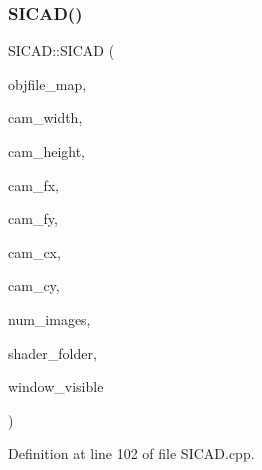 \subsubsection{\texorpdfstring{S\+I\+C\+A\+D()}{SICAD()}\hspace{0.1cm}{\footnotesize\ttfamily [8/9]}}
{\footnotesize\ttfamily S\+I\+C\+A\+D\+::\+S\+I\+C\+AD (\begin{DoxyParamCaption}\item[{const \mbox{\hyperlink{classSICAD_a9e1e1460d4c0f331b4fd015aae4dd721}{Model\+Path\+Container}} \&}]{objfile\+\_\+map,  }\item[{const G\+Lsizei}]{cam\+\_\+width,  }\item[{const G\+Lsizei}]{cam\+\_\+height,  }\item[{const G\+Lfloat}]{cam\+\_\+fx,  }\item[{const G\+Lfloat}]{cam\+\_\+fy,  }\item[{const G\+Lfloat}]{cam\+\_\+cx,  }\item[{const G\+Lfloat}]{cam\+\_\+cy,  }\item[{const G\+Lint}]{num\+\_\+images,  }\item[{const std\+::string \&}]{shader\+\_\+folder,  }\item[{const bool}]{window\+\_\+visible }\end{DoxyParamCaption})}



Definition at line 102 of file S\+I\+C\+A\+D.\+cpp.

\mbox{\label{classSICAD_ac4e6349b361e3ec41d828e0d0f77f12b}} 
